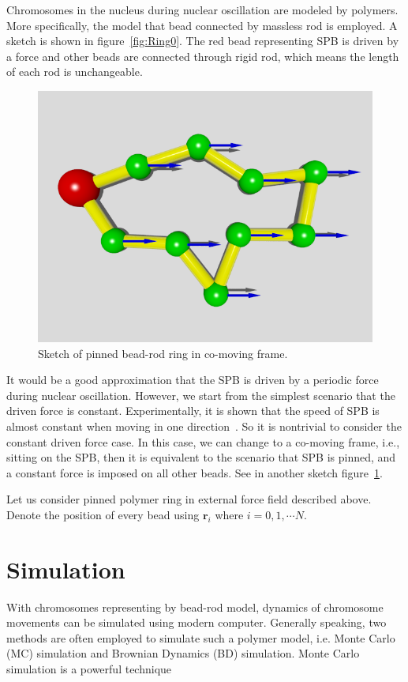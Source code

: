 \documentclass[12pt,a4paper]{article}
\begin{document}
Chromosomes in the nucleus during nuclear oscillation are modeled by polymers.
More specifically, the model that bead connected by massless rod is employed.
A sketch is shown in figure~\ref{fig:Ring0}. The red bead representing SPB is
driven by a force and other beads are connected through rigid rod, which means
the length of each rod is unchangeable.   

\begin{figure}[htpb]
	\centering
	\includegraphics[width=0.8\linewidth]{figs/Ring1.png}
	\caption{Sketch of pinned bead-rod ring in co-moving frame.}
	\label{fig:Ring1}
\end{figure}
It would be a good approximation that the SPB is driven by a periodic force
during nuclear oscillation. However, we start from the simplest scenario that
the driven force is constant. Experimentally, it is shown that the speed
of SPB is almost constant when moving in one direction~\cite{Vogel2009}. So it
is nontrivial to consider the constant driven force case. In this case, we can
change to a co-moving frame, i.e., sitting on the SPB, then it is equivalent
to the scenario that SPB is pinned, and a constant force is imposed on all
other beads. See in another sketch figure~\ref{fig:Ring1}. 

Let us consider pinned polymer ring in external force field described above.
Denote the position of every bead using $\mathbf{r}_i$ where $i = 0,1,\cdots N$.

\section{Simulation}
\label{sec:simulation}
With chromosomes representing by bead-rod model, dynamics of chromosome
movements can be simulated using modern computer. Generally speaking, two
methods are often employed to simulate such a polymer model, i.e. Monte Carlo
(MC) simulation and Brownian Dynamics (BD) simulation. Monte Carlo simulation
is a powerful technique 
\end{document}
